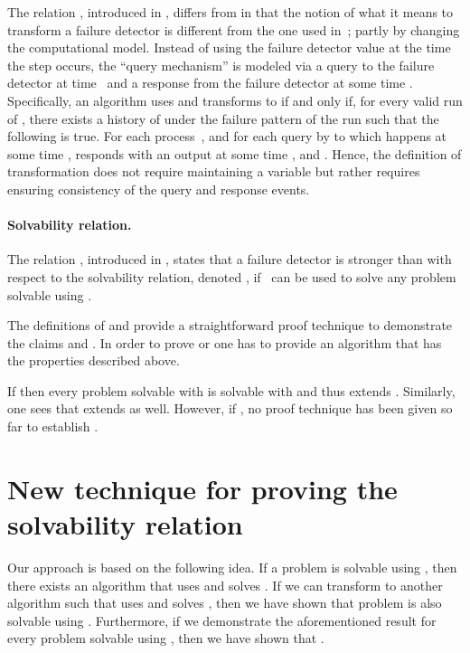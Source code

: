 \documentclass[11pt]{article}
\begin{document}
The relation , introduced in \cite{jayanti:ephawfd}, differs
     from  in that the notion of what it means to transform a
     failure detector is different from the one used
     in~\cite{chan:ufdfr}; partly by changing the computational model.
Instead of using the failure detector value at the time the step
     occurs, the ``query mechanism'' is modeled via a query to the
     failure detector at time~ and a response from the failure
     detector at some time .
Specifically, an algorithm  uses  and
     transforms  to  if and only if, for every valid run of
     , there exists a history  of 
     under the failure pattern of the run such that the following is
     true.
For each process~, and for each query by  to
      which happens at some time ,
      responds with an output  at some
     time , and .
Hence, the definition of transformation does not require  maintaining
     a variable  but rather requires ensuring
     consistency of the query and response events.


\paragraph{Solvability relation.} 

The relation , introduced in \cite{charron-bost:10:isolt},
     states that a failure detector  is stronger than 
     with respect to the solvability relation, denoted
     , if~ {can be used to solve} any problem
     solvable using .


\bigskip



The definitions of  and  provide a straightforward
     proof technique to demonstrate the claims  and .
In order to prove  or   one has to
     provide an algorithm  that has the
     properties described above.


If  then every problem solvable with  is solvable
     with  \cite{chan:ufdfr,chan:twfdf1} and thus  
     extends .
Similarly, one sees that  extends  as well.
However, if  , no proof technique has been given so
     far to establish .

\section{New technique for proving the solvability relation} 

Our approach is based on the following idea.
If a problem  is solvable using , then there exists an
     algorithm  that uses  and solves .
If we can transform  to another algorithm  such that
      uses  and solves , then we have shown that
     problem  is also solvable using .
Furthermore, if we demonstrate the aforementioned result for every
     problem solvable using , then we have shown that
     .
\end{document}
